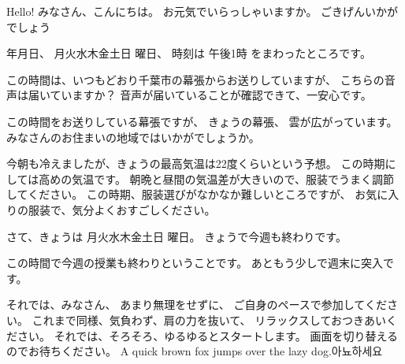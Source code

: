 \documentclass[12pt, jafontscale=0.9247]{jlreq}
\makeatletter
\newcommand{\mytoday}{{\the\year}年{\the\month}月{\the\day}日}
\newcommand{\DOWjpn}{%
\DTMcomputedayofweekindex{\@dtm@currentyear-\@dtm@currentmonth-\@dtm@currentday}{\DOWindex}%
\ifcase\DOWindex 月\or 火\or 水\or 木\or 金\or 土\or 日\fi%
}
\makeatother
\begin{document}
{\gtfamily\bfseries


  Hello! みなさん、こんにちは。 お元気でいらっしゃいますか。
  ごきげんいかがでしょう

  \mytoday{}、\DOWjpn{}曜日、
  時刻は
  午後1時
  をまわったところです。

  この時間は、いつもどおり千葉市の幕張からお送りしていますが、 こちらの音声は届いていますか？
  音声が届いていることが確認できて、一安心です。

  \bigskip

  この時間をお送りしている幕張ですが、
  きょうの幕張、
  雲が広がっています。
  みなさんのお住まいの地域ではいかがでしょうか。

  今朝も冷えましたが、きょうの最高気温は22度くらいという予想。
  この時期にしては高めの気温です。
  朝晩と昼間の気温差が大きいので、服装でうまく調節してください。
  この時期、服装選びがなかなか難しいところですが、
  お気に入りの服装で、気分よくおすごしください。

  \bigskip

  さて、きょうは\DOWjpn{}曜日。
  きょうで今週も終わりです。

  この時間で今週の授業も終わりということです。
  あともう少しで週末に突入です。



  それでは、みなさん、 あまり無理をせずに、 ご自身のペースで参加してください。
  これまで同様、気負わず、肩の力を抜いて、 リラックスしておつきあいください。
  それでは、そろそろ、ゆるゆるとスタートします。
  画面を切り替えるのでお待ちください。
  \newpage
  { A quick brown fox jumps over the lazy dog.아뇨하세요}

}
\end{document}
